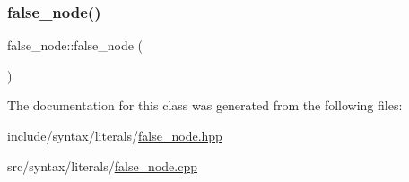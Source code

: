 \subsubsection{\texorpdfstring{false\+\_\+node()}{false\_node()}}
{\footnotesize\ttfamily false\+\_\+node\+::false\+\_\+node (\begin{DoxyParamCaption}{ }\end{DoxyParamCaption})}



The documentation for this class was generated from the following files\+:\begin{DoxyCompactItemize}
\item 
include/syntax/literals/\hyperlink{false__node_8hpp}{false\+\_\+node.\+hpp}\item 
src/syntax/literals/\hyperlink{false__node_8cpp}{false\+\_\+node.\+cpp}\end{DoxyCompactItemize}
